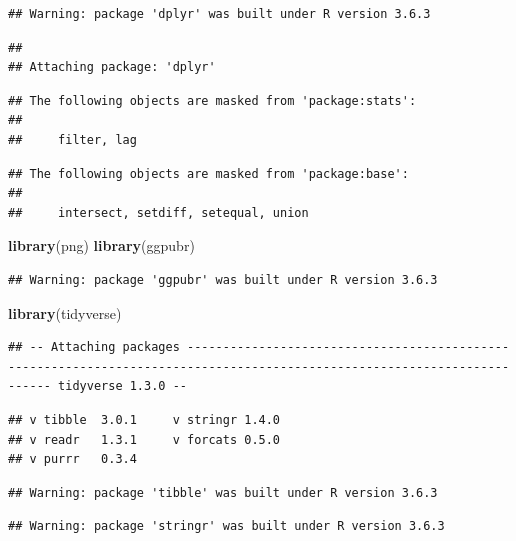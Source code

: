 \documentclass[
]{article}
\newenvironment{Shaded}{\begin{snugshade}}{\end{snugshade}}
\newcommand{\KeywordTok}[1]{\textcolor[rgb]{0.13,0.29,0.53}{\textbf{#1}}}
\newcommand{\NormalTok}[1]{#1}
\begin{document}
\begin{verbatim}
## Warning: package 'dplyr' was built under R version 3.6.3
\end{verbatim}

\begin{verbatim}
## 
## Attaching package: 'dplyr'
\end{verbatim}

\begin{verbatim}
## The following objects are masked from 'package:stats':
## 
##     filter, lag
\end{verbatim}

\begin{verbatim}
## The following objects are masked from 'package:base':
## 
##     intersect, setdiff, setequal, union
\end{verbatim}

\begin{Shaded}
\begin{Highlighting}[]
\KeywordTok{library}\NormalTok{(png)}
\KeywordTok{library}\NormalTok{(ggpubr)}
\end{Highlighting}
\end{Shaded}

\begin{verbatim}
## Warning: package 'ggpubr' was built under R version 3.6.3
\end{verbatim}

\begin{Shaded}
\begin{Highlighting}[]
\KeywordTok{library}\NormalTok{(tidyverse)}
\end{Highlighting}
\end{Shaded}

\begin{verbatim}
## -- Attaching packages ------------------------------------------------------------------------------------------------------------------------- tidyverse 1.3.0 --
\end{verbatim}

\begin{verbatim}
## v tibble  3.0.1     v stringr 1.4.0
## v readr   1.3.1     v forcats 0.5.0
## v purrr   0.3.4
\end{verbatim}

\begin{verbatim}
## Warning: package 'tibble' was built under R version 3.6.3
\end{verbatim}

\begin{verbatim}
## Warning: package 'stringr' was built under R version 3.6.3
\end{verbatim}
\end{document}

